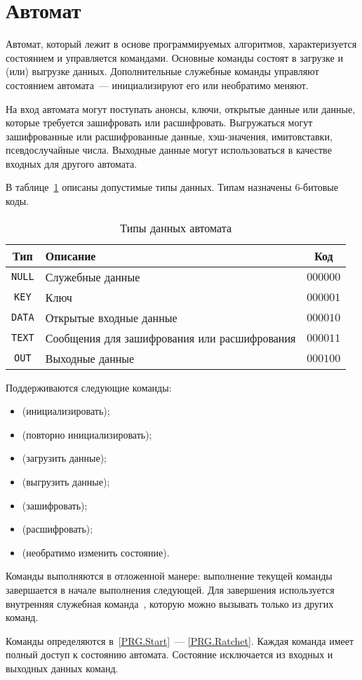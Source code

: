 \section{Автомат}\label{PRG.Auto}

Автомат, который лежит в основе программируемых алгоритмов, 
характеризуется состоянием и управляется командами.
%
Основные команды состоят в загрузке и (или) выгрузке данных.
Дополнительные служебные команды управляют состоянием автомата~---
инициализируют его или необратимо меняют.

На вход автомата могут поступать анонсы, ключи, 
открытые данные или данные, которые требуется зашифровать или расшифровать. 
%
Выгружаться могут зашифрованные или расшифрованные данные, хэш-значения, 
имитовставки, псевдослучайные числа. Выходные данные могут использоваться в 
качестве входных для другого автомата.

В таблице~\ref{Table.PRG.InOut} описаны допустимые типы данных. 
Типам назначены $6$-битовые коды.

\begin{table}[thb]
\caption{Типы данных автомата}\label{Table.PRG.InOut}
\begin{tabular}{|c|l|c|}
\hline
Тип & Описание & Код\\
\hline
\hline
\texttt{NULL} & Служебные данные & 
$000000$\\
%
\texttt{KEY} & Ключ & 
$000001$\\
%
\texttt{DATA} & Открытые входные данные & 
$000010$\\
%
\texttt{TEXT} & Сообщения для зашифрования или расшифрования & 
$000011$\\
%
\texttt{OUT} & Выходные данные & 
$000100$\\
\hline
\end{tabular}
\end{table}

Поддерживаются следующие команды:
\begin{itemize}
\item
{} (инициализировать);
\item
{} (повторно инициализировать);
\item
{} (загрузить данные);
\item
{} (выгрузить данные);
\item
{} (зашифровать);
\item
{} (расшифровать);
\item
{} (необратимо изменить состояние).
\end{itemize}

Команды выполняются в отложенной манере: выполнение текущей 
команды завершается в начале выполнения следующей.
Для завершения используется внутренняя служебная команда~, 
которую можно вызывать только из других команд.

Команды определяются в~\ref{PRG.Start}~--- \ref{PRG.Ratchet}.
%
Каждая команда имеет полный доступ к состоянию автомата.
Состояние исключается из входных и выходных данных команд.

